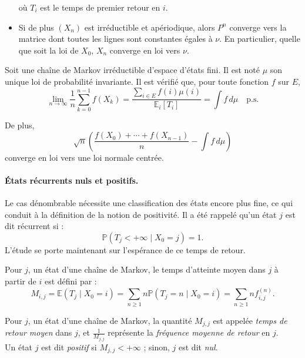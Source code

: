 \begin{sloppypar}
\begin{itemize}
où $T_i$ est le temps de premier retour en $i$.

\item Si de plus $(X_n)$ est irréductible et apériodique, alors $P^n$ converge vers la matrice dont
toutes les lignes sont constantes égales à $\nu$. En particulier, quelle que soit la loi de $X_0$, $X_n$
converge en loi vers $\nu$.
\end{itemize}

\begin{tcolorbox}[colback=blue!5!white,colframe=blue!75!black,title=Définition]
Soit une chaîne de Markov irréductible d’espace d’états fini. Il est noté $\mu$ son unique loi de probabilité invariante. Il est vérifié que, pour toute fonction $f$ sur $E$,
\[
\lim_{n \to \infty} \frac{1}{n} \sum_{k=0}^{n-1} f(X_k) = \frac{\displaystyle{\sum_{i \in E}} f(i) \mu(i)}{\mathbb{E}_i[T_i]} = \int f \, d\mu \quad \text{p.s.}
\]

De plus,
\[
\sqrt{n} \left( \frac{f(X_0) + \cdots + f(X_{n-1})}{n} - \int f \, d\mu \right)
\]
converge en loi vers une loi normale centrée.
\end{tcolorbox}

\paragraph{États récurrents nuls et positifs.} Le cas dénombrable nécessite une classification des états encore plus fine, ce qui conduit à la définition de la notion de positivité. Il a été rappelé qu’un état $j$ est dit récurrent si :
\[
\mathbb{P}(T_j < +\infty \mid X_0 = j) = 1.
\]
L’étude se porte maintenant sur l’espérance de ce temps de retour.

\begin{tcolorbox}[colback=blue!5!white,colframe=blue!75!black,title=Définition]
Pour $j$, un état d’une chaîne de Markov, le temps d’atteinte moyen dans $j$ à partir de $i$ est défini par :
\[
M_{i,j} = \mathbb{E}(T_j \mid X_0 = i) = \sum_{n \geq 1} n \mathbb{P}(T_j = n \mid X_0 = i) = \sum_{n \geq 1} n f^{(n)}_{i,j}.
\]

Pour $j$, un état d’une chaîne de Markov, la quantité $M_{j,j}$ est appelée \textit{temps de retour moyen} dans $j$, et $\frac{1}{M_{j,j}}$ représente la \textit{fréquence moyenne de retour} en $j$.\\

Un état $j$ est dit \textit{positif} si $M_{j,j} < +\infty$ ; sinon, $j$ est dit \textit{nul}.
\end{tcolorbox}


\end{sloppypar}
